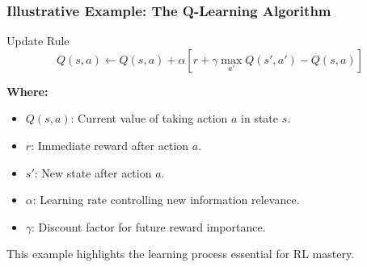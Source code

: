 \documentclass[aspectratio=169]{beamer}
\begin{document}
\begin{frame}[fragile]
    \frametitle{Illustrative Example: The Q-Learning Algorithm}
    \begin{block}{Update Rule}
        \begin{equation}
            Q(s, a) \leftarrow Q(s, a) + \alpha \left[ r + \gamma \max_{a'} Q(s', a') - Q(s, a) \right]
        \end{equation}
    \end{block}
    \textbf{Where:}
    \begin{itemize}
        \item $Q(s, a)$: Current value of taking action $a$ in state $s$.
        \item $r$: Immediate reward after action $a$.
        \item $s'$: New state after action $a$.
        \item $\alpha$: Learning rate controlling new information relevance.
        \item $\gamma$: Discount factor for future reward importance.
    \end{itemize}
    This example highlights the learning process essential for RL mastery.
\end{frame}
\end{document}

